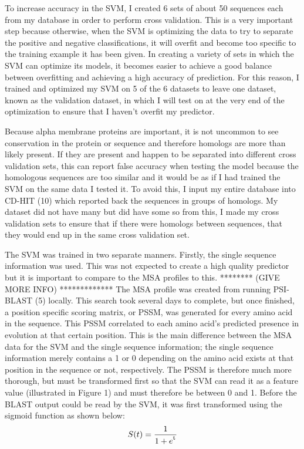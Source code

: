 \documentclass[final]{article}
\begin{document}
To increase accuracy in the SVM, I created 6 sets of about 50 sequences each from my database in order to perform cross validation. This is a very important step because otherwise, when the SVM is optimizing the data to try to separate the positive and negative classifications, it will overfit and become too specific to the training example it has been given. In creating a variety of sets in which the SVM can optimize its models, it becomes easier to achieve a good balance between overfitting and achieving a high accuracy of prediction. For this reason, I trained and optimized my SVM on 5 of the 6 datasets to leave one dataset, known as the validation dataset, in which I will test on at the very end of the optimization to ensure that I haven't overfit my predictor. 

Because alpha membrane proteins are important, it is not uncommon to see conservation in the protein or sequence and therefore homologs are more than likely present. If they are present and happen to be separated into different cross validation sets, this can report false accuracy when testing the model because the homologous sequences are too similar and it would be as if I had trained the SVM on the same data I tested it. To avoid this, I input my entire database into CD-HIT (10) which reported back the sequences in groups of homologs. My dataset did not have many but did have some so from this, I made my cross validation sets to ensure that if there were homologs between sequences, that they would end up in the same cross validation set. 

The SVM was trained in two separate manners. Firstly, the single sequence information was used. This was not expected to create a high quality predictor but it is important to compare to the MSA profiles to this. ******** (GIVE MORE INFO) ************* The MSA profile was created from running PSI-BLAST (5) locally. This search took several days to complete, but once finished, a position specific scoring matrix, or PSSM, was generated for every amino acid in the sequence. This PSSM correlated to each amino acid's predicted presence in evolution at that certain position. This is the main difference between the MSA data for the SVM and the single sequence information; the single sequence information merely contains a 1 or 0 depending on the amino acid exists at that position in the sequence or not, respectively. The PSSM is therefore much more thorough, but must be transformed first so that the SVM can read it as a feature value (illustrated in Figure 1) and must therefore be between 0 and 1. Before the BLAST output could be read by the SVM, it was first transformed using the sigmoid function as shown below:
 \[
\\S(t)=\frac{1}{1+ e^\textsuperscript{t}}
\] 
\end{document}
